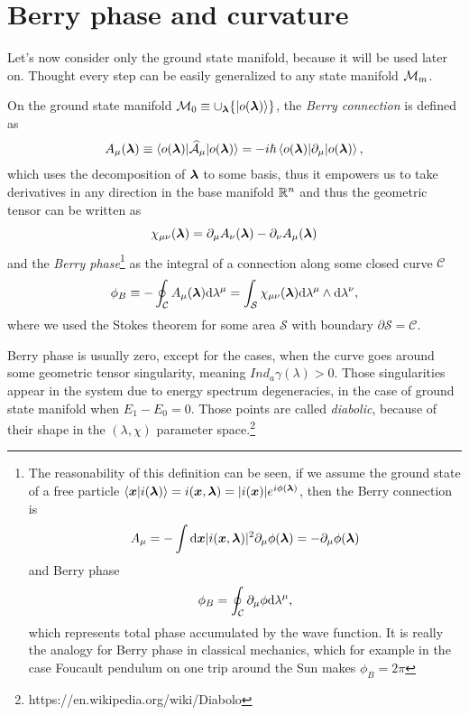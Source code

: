 \section{Berry phase and curvature}
Let's now consider only the ground state manifold, because it will be used later on. Thought every step can be easily generalized to any state manifold $\mathcal{M}_m$.

On the ground state manifold $\mathcal{M}_0\equiv \cup_{\bm\lambda} \{\ket{o({\bm\lambda})}\}$, the \emph{Berry connection} is defined as
\begin{equation}
    A_\mu({\bm\lambda})\equiv \braket{o({\bm\lambda})|\mathcal{\widehat{A}}_\mu|o({\bm\lambda})}=-i\hbar \braket{o({\bm\lambda})|\partial_\mu|o({\bm\lambda})},
    \label{eq:berryConnection}
\end{equation}
which uses the decomposition of ${\bm\lambda}$ to some basis, thus it empowers us to take derivatives in any direction in the base manifold $\mathbb{R}^n$ and thus the geometric tensor can be written as
\begin{equation}
    \chi_{\mu\nu}({\bm\lambda}) = \partial_\mu A_\nu({\bm\lambda})-\partial_\nu A_\mu({\bm\lambda})
\end{equation}
and the \emph{Berry phase}\footnote{
    The reasonability of this definition can be seen, if we assume the ground state of a free particle
        $\braket{\bm{x}|i({\bm\lambda})}=i(\bm{x},{\bm\lambda})= |i(\bm{x})|e^{i\phi({\bm\lambda})}$,
    then the Berry connection is
    \begin{equation}
        A_\mu=-\int \mathrm{d} \bm{x}|i(\bm{x},{\bm\lambda})|^2\partial_\mu \phi({\bm\lambda}) = -\partial_\mu \phi({\bm\lambda})
    \end{equation} 
    and Berry phase
    \begin{equation}
        \phi_B=\oint_\mathcal{C} \partial_\mu \phi \mathrm{d} \lambda^\mu,
    \end{equation}
    which represents total phase accumulated by the wave function. It is really the analogy for Berry phase in classical mechanics, which for example in the case Foucault pendulum on one trip around the Sun makes $\phi_B=2\pi$
}
as the integral of a connection along some closed curve $\mathcal{C}$
\begin{equation}
    \phi_B\equiv-\oint_\mathcal{C} A_\mu({\bm\lambda})\mathrm{d} \lambda^\mu=\int_\mathcal{S} \chi_{\mu\nu}({\bm\lambda})\mathrm{d} \lambda^\mu \wedge \mathrm{d}\lambda^\nu,
\end{equation}
where we used the Stokes theorem for some area $\mathcal{S}$ with boundary $\partial\mathcal{S}=\mathcal{C}$.

Berry phase is usually zero, except for the cases, when the curve goes around some geometric tensor singularity, meaning $Ind_a \gamma(\lambda)>0$. Those singularities appear in the system due to energy spectrum degeneracies, in the case of ground state manifold when $E_1-E_0=0$. Those points are called \emph{diabolic}, because of their shape in the $(\lambda,\chi)$ parameter space.\footnote{https://en.wikipedia.org/wiki/Diabolo}




